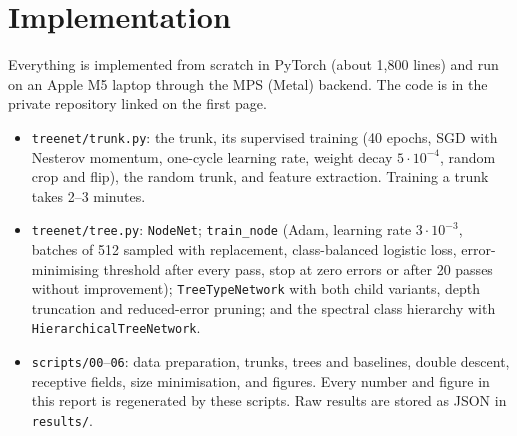 \section{Implementation}
\label{sec:impl}

Everything is implemented from scratch in PyTorch (about 1{,}800 lines) and run on an Apple M5 laptop through
the MPS (Metal) backend. The code is in the private repository linked on the first page.
\begin{itemize}
\item \texttt{treenet/trunk.py}: the trunk, its supervised training (40 epochs, SGD with Nesterov momentum,
one-cycle learning rate, weight decay $5\cdot10^{-4}$, random crop and flip), the random trunk, and feature
extraction. Training a trunk takes 2--3 minutes.
\item \texttt{treenet/tree.py}: \texttt{NodeNet}; \texttt{train\_node} (Adam, learning rate $3\cdot10^{-3}$,
batches of 512 sampled with replacement, class-balanced logistic loss, error-minimising threshold after every
pass, stop at zero errors or after 20 passes without improvement); \texttt{TreeTypeNetwork} with both child
variants, depth truncation and reduced-error pruning; and the spectral class hierarchy with
\texttt{HierarchicalTreeNetwork}.
\item \texttt{scripts/00}--\texttt{06}: data preparation, trunks, trees and baselines, double descent,
receptive fields, size minimisation, and figures. Every number and figure in this report is regenerated by
these scripts. Raw results are stored as JSON in \texttt{results/}.
\end{itemize}

